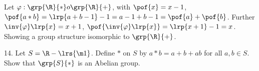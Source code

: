 \begin{mdframed}[style=darkAnswer,frametitle={Joe Starr}]
Let $\varphi:\grp{\R}{\ast}  o\grp{\R}{+}$, with $\pof{x}=x-1$,
$\pof{a\ast b}= \lrp{a+b-1}-1=a-1+b-1=\pof{a}+\pof{b}$. Further
$\inv{\varphi}\lrp{x}=x+1$, $\pof{\inv{\varphi}\lrp{x}}=\lrp{x+1}-1=x$.
Showing a group structure isomorphic to $\grp{\R}{+}$.
\end{mdframed}
\newpage
\begin{mdframed}[style=darkQuesion]
14. Let $S= \R - \lrs{\m1}$. Define $\ast$ on $S$ by $a\ast b=a+b+ab$ for all
$a,b \in S$. Show that $\grp{S}{\ast}$ is an Abelian group.
\end{mdframed}

